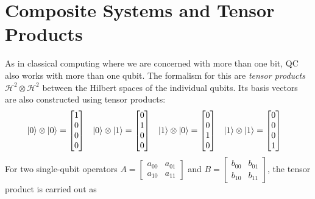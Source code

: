 	\section{Composite Systems and Tensor Products}
		\label{sec:composite}

		As in classical computing where we are concerned with more than one bit, \ac{QC} also works with more than one qubit. The formalism for this are \emph{tensor products} \( \mathcal{H}^2 \otimes \mathcal{H}^2 \) between the Hilbert spaces of the individual qubits. Its basis vectors are also constructed using tensor products:
		\begin{align}
			\ket{0} \otimes \ket{0} &= \begin{bmatrix} 1 \\ 0 \\ 0 \\ 0 \end{bmatrix} &
			\ket{0} \otimes \ket{1} &= \begin{bmatrix} 0 \\ 1 \\ 0 \\ 0 \end{bmatrix} &
			\ket{1} \otimes \ket{0} &= \begin{bmatrix} 0 \\ 0 \\ 1 \\ 0 \end{bmatrix} &
			\ket{1} \otimes \ket{1} &= \begin{bmatrix} 0 \\ 0 \\ 0 \\ 1 \end{bmatrix}
		\end{align}
		For two single-qubit operators \( A = \begin{bmatrix} a_{00} & a_{01} \\ a_{10} & a_{11} \end{bmatrix} \) and \( B = \begin{bmatrix} b_{00} & b_{01} \\ b_{10} & b_{11} \end{bmatrix} \), the tensor product is carried out as
